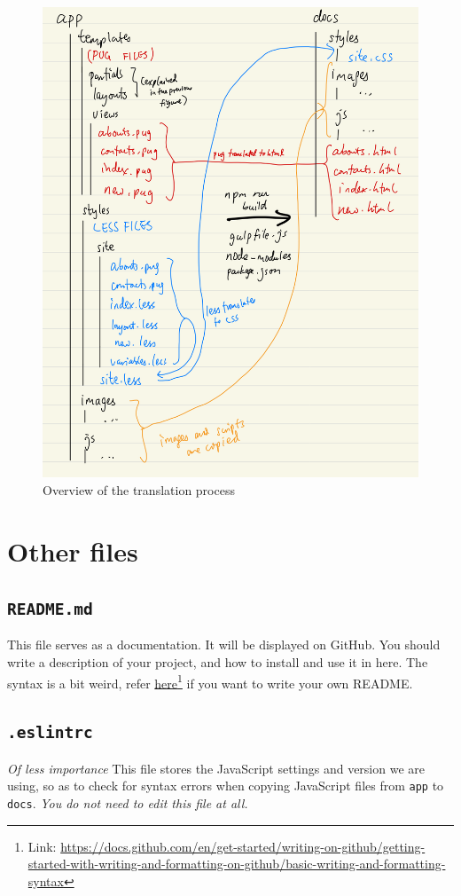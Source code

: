 \begin{figure}[h]
\centering
\includegraphics[width=15cm]{images/chn6-full-translation.png}
\caption{Overview of the translation process}
\label{fig:createnewrepo}
\end{figure}

\section{Other files}

\subsection{\texttt{README.md}}
\label{sec:readme}

This file serves as a documentation. It will be displayed on GitHub. You should write a description of your project, and how to install and use it in here. The syntax is a bit weird, refer \href{https://docs.github.com/en/get-started/writing-on-github/getting-started-with-writing-and-formatting-on-github/basic-writing-and-formatting-syntax}{here}\footnote{Link: \url{https://docs.github.com/en/get-started/writing-on-github/getting-started-with-writing-and-formatting-on-github/basic-writing-and-formatting-syntax}} if you want to write your own README.

\subsection{\texttt{.eslintrc}}

\textit{Of less importance}
\vspace{6mm}
This file stores the JavaScript settings and version we are using, so as to check for syntax errors when copying JavaScript files from \texttt{app} to \texttt{docs}. \textit{You do not need to edit this file at all.}
